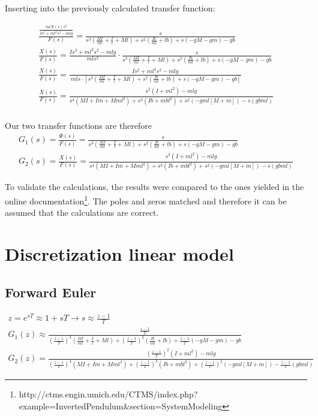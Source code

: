 Inserting into the previously calculated transfer function:

\begin{eqnarray}
	\frac{\frac{mlX\left(s\right)s^2}{Is^2+ml^2s^2-mlg}}{F\left(s\right)}=\frac{s}{s^3\left(\frac{MI}{ml}+\frac{I}{l}+Ml\right)+s^2\left(\frac{Ib}{ml}+lb\right)+s(-gM-gm)-gb}
	\\
	\frac{X\left(s\right)}{F\left(s\right)}=\frac{Is^2+ml^2s^2-mlg}{mls^2}\cdot\frac{s}{s^3\left(\frac{MI}{ml}+\frac{I}{l}+Ml\right)+s^2\left(\frac{Ib}{ml}+lb\right)+s(-gM-gm)-gb}
	\\
	\frac{X\left(s\right)}{F\left(s\right)}=\frac{Is^2+ml^2s^2-mlg}{\ mls\cdot\left[s^3\left(\frac{MI}{ml}+\frac{I}{l}+Ml\right)+s^2\left(\frac{Ib}{ml}+lb\right)+s\left(-gM-gm\right)-gb\right]}
	\\
	\frac{X\left(s\right)}{F\left(s\right)}=\frac{s^2\left(I+ml^2\right)-mlg}{s^4\left(MI+Im+Mml^2\right)+s^3\left(Ib+m{bl}^2\right)+s^2\left(-gml\left[M+m\right]\right)-s\left(gbml\right)}
	\\
\end{eqnarray}

Our two transfer functions are therefore
\begin{eqnarray}
	G_1\left(s\right)=\frac{\Phi\left(s\right)}{F\left(s\right)}=\frac{s}{s^3\left(\frac{MI}{ml}+\frac{I}{l}+Ml\right)+s^2\left(\frac{Ib}{ml}+lb\right)+s(-gM-gm)-gb}
	\\
	G_2\left(s\right)=\frac{X\left(s\right)}{F\left(s\right)}=\frac{s^2\left(I+ml^2\right)-mlg}{s^4\left(MI+Im+Mml^2\right)+s^3\left(Ib+m{bl}^2\right)+s^2\left(-gml\left[M+m\right]\right)-s\left(gbml\right)}
\end{eqnarray}

To validate the calculations, the results were compared to the ones yielded in the online documentation\footnote{http://ctms.engin.umich.edu/CTMS/index.php?example=InvertedPendulum\&section=SystemModeling}.  The poles and zeros matched and therefore it can be assumed that the calculations are correct.

\section{Discretization linear model}

	\subsection{Forward Euler}
	
		\begin{eqnarray}
			z = e^{sT} \approx 1 + sT \rightarrow s \approx \frac{z - 1}{T}\\
			G_1\left(z\right) \approx \frac{\frac{z - 1}{T}}{\left( \frac{z - 1}{T}\right) ^3\left(\frac{MI}{ml}+\frac{I}{l}+Ml\right)+\left( \frac{z - 1}{T}\right) ^2\left(\frac{Ib}{ml}+lb\right)+\frac{z - 1}{T}(-gM-gm)-gb}\\
			G_2\left(z\right)=\frac{\left( \frac{z - 1}{T}\right) ^2\left(I+ml^2\right)-mlg}{\left( \frac{z - 1}{T}\right) ^4\left(MI+Im+Mml^2\right)+\left( \frac{z - 1}{T}\right) ^3\left(Ib+m{bl}^2\right)+\left( \frac{z - 1}{T}\right) ^2\left(-gml\left[M+m\right]\right)-\frac{z - 1}{T}\left(gbml\right)}
		\end{eqnarray}
	
